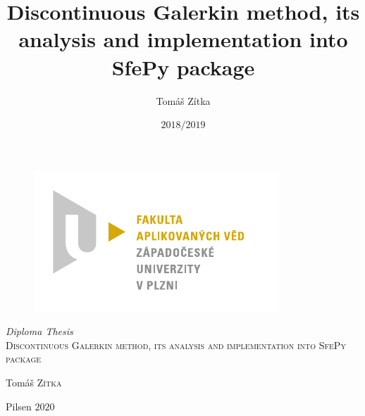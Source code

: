 \documentclass{book}
\title{Discontinuous Galerkin method, its analysis and implementation into SfePy package}
\author{Tomáš Zítka}
\date{$2018/2019$}
\theoremstyle{definition}
\numberwithin{equation}{section}
\numberwithin{table}{section}
\begin{document}
\begin{titlepage}	 
	\begin{figure}[h]
 	 \centering
 	 \includegraphics[scale=1]{./fav_cmyk.pdf}
 	\end{figure}
 	\center %
 	
	\textit{{\large Diploma Thesis}}\\[1.5cm]
	\textsc{\LARGE  Discontinuous Galerkin method, its analysis and implementation into SfePy package}\\

	\vfill
	\begin{minipage}{0.4 \textwidth}
		\begin{flushleft}
		Tomáš \textsc{Zítka}\\
		\end{flushleft}	
	\end{minipage}
	\begin{minipage}{0.4\textwidth}	
		\begin{flushright}
		Pilsen $2020$
		\end{flushright}
	\end{minipage}
\end{titlepage}
\end{document}
